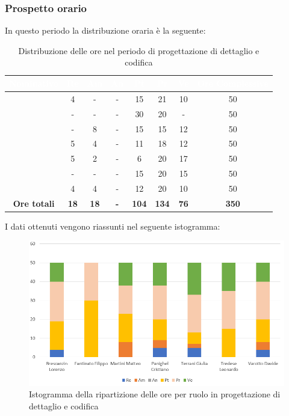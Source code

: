 \subsubsection{Prospetto orario}
In questo periodo la distribuzione oraria è la seguente:
\begin{table}[H]
	\begin{center}
		\begin{tabular}{ |c c c c c c c c| }
		\rowcolor{darkblue} 
		\textcolor{white}{\textbf{Nominativo}} & \textcolor{white}{\textbf{Re}} & \textcolor{white}{\textbf{Am}} & \textcolor{white}{\textbf{An}} & \textcolor{white}{\textbf{Pt}} & \textcolor{white}{\textbf{Pr}} & \textcolor{white}{\textbf{Ve}} & \textcolor{white}{\textbf{Ore Complessive}} \\ \hline
		\BL 	& 4  	& -  	& - 	& 15 	& 21 	& 10 	& 50 \\ \hline
		\FF 	& -  	& -  	& - 	& 30 	& 20 	& -  	& 50 \\ \hline
		\MM 	& -  	& 8  	& - 	& 15 	& 15 	& 12 	& 50 \\ \hline
		\PC 	& 5 	& 4  	& - 	& 11 	& 18 	& 12 	& 50 \\ \hline
		\TG 	& 5  	& 2		& - 	& 6 	& 20 	& 17 	& 50 \\ \hline
		\TL 	& -  	& - 	& - 	& 15 	& 20 	& 15 	& 50 \\ \hline
		\VD 	& 4  	& 4  	& - 	& 12 	& 20 	& 10 	& 50 \\ \hline
		\textbf{Ore totali} & \textbf{18} & \textbf{18} & \textbf{-} & \textbf{104} & \textbf{134} & \textbf{76} & \textbf{350} \\ \hline
		\end{tabular}
	\caption{Distribuzione delle ore nel periodo di progettazione di dettaglio e codifica}
	\end{center}
\end{table}
I dati ottenuti vengono riassunti nel seguente istogramma:
\begin{figure}[H]
    \centering
    \includegraphics[scale = 0.70]{Immagini/DettaglioIsto.png}
    \caption{Istogramma della ripartizione delle ore per ruolo in progettazione di dettaglio e codifica}
    \label{fig:istogramma ripartizione ore, periodo di Progettazione di Dettaglio e Codifica}
\end{figure}
\newpage
